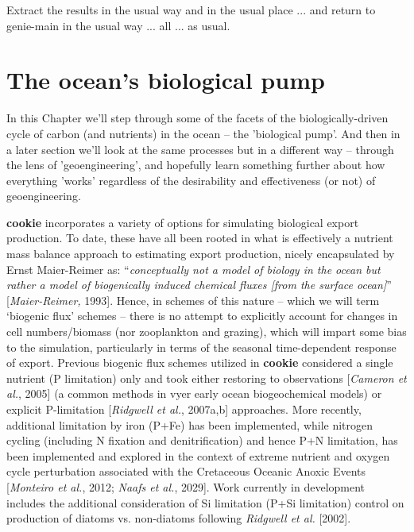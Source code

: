 \vspace{2mm}
\noindent Extract the results in the usual way and in the usual place ... and return to \textsf{\footnotesize genie-main} in the usual way ... all ... as usual.

\newpage

\section*{The ocean's biological pump}

In this Chapter we'll step through some of the facets of the biologically-driven cycle of carbon (and nutrients) in the ocean -- the 'biological pump'. And then in a later section we'll look at the same processes but in a different way -- through the lens of 'geoengineering', and hopefully learn something further about how everything 'works' regardless of the desirability and effectiveness (or not) of geoengineering.

\vspace{1mm}
\textbf{cookie} incorporates a variety of options for simulating biological export production. To date, these have all been rooted in what is effectively a nutrient mass balance approach to estimating export production, nicely encapsulated by Ernst Maier-Reimer as: “\textit{conceptually not a model of biology in the ocean but rather a model of biogenically induced chemical fluxes [from the surface ocean]}” [\textit{Maier-Reimer,} 1993]. Hence, in schemes of this nature -- which we will term ‘biogenic  flux’ schemes --  there is no attempt to explicitly account for changes in cell numbers/biomass (nor zooplankton and grazing), which will impart some bias to the simulation, particularly in terms of the seasonal time-dependent response of export. Previous biogenic flux schemes utilized in  \textbf{cookie}  considered a single nutrient (P limitation) only and took either restoring to observations [\textit{Cameron et al.}, 2005] (a common methods in vyer early ocean biogeochemical models) or explicit P-limitation [\textit{Ridgwell et al.}, 2007a,b] approaches. More recently, additional limitation by iron (P+Fe) has been implemented, while nitrogen cycling (including N fixation and denitrification) and hence P+N limitation, has been implemented and explored in the context of extreme nutrient and oxygen cycle perturbation associated with the Cretaceous Oceanic Anoxic Events [\textit{Monteiro et al.}, 2012; \textit{Naafs et al.}, 2029]. Work currently in development includes the additional consideration of Si limitation (P+Si limitation) control on production of diatoms vs. non-diatoms following \textit{\textit{Ridgwell et al.}} [2002].

